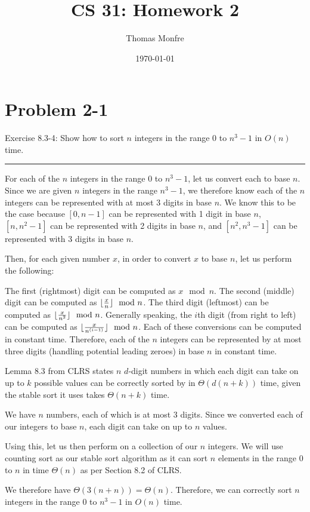 \documentclass[11pt]{article}
\title{CS 31: Homework 2}
\author{Thomas Monfre}
\date{\today}
\def\separateline{\medskip\hrule\medskip}
\DeclarePairedDelimiter\floor{\lfloor}{\rfloor}
\begin{document}
\maketitle

\section{Problem 2-1}
Exercise 8.3-4: Show how to sort $n$ integers in the range 0 to $n^3 - 1$ in $O(n)$ time.
\separateline

For each of the $n$ integers in the range 0 to $n^3 - 1$, let us convert each to base $n$. Since we are given $n$ integers in the range $n^3 - 1$, we therefore know each of the $n$ integers can be represented with at most 3 digits in base $n$. We know this to be the case because $[0, n-1]$ can be represented with 1 digit in base $n$, $[n, n^2 - 1]$ can be represented with 2 digits in base $n$, and $[n^2, n^3 - 1]$ can be represented with 3 digits in base $n$.

Then, for each given number $x$, in order to convert $x$ to base $n$, let us perform the following:

The first (rightmost) digit can be computed as $x \mod n$. The second (middle) digit can be computed as $\floor{\frac{x}{n}} \mod n$. The third digit (leftmost) can be computed as $\floor{\frac{x}{n^2}} \mod n$. Generally speaking, the $i$th digit (from right to left) can be computed as $\floor{\frac{x}{n^{(i - 1)}}} \mod n$. Each of these conversions can be computed in constant time. Therefore, each of the $n$ integers can be represented by at most three digits (handling potential leading zeroes) in base $n$ in constant time.

Lemma 8.3 from CLRS states $n$ $d$-digit numbers in which each digit can take on up to $k$ possible values can be correctly sorted by  in $\Theta(d(n + k))$ time, given the stable sort it uses takes $\Theta(n + k)$ time.

We have $n$ numbers, each of which is at most 3 digits. Since we converted each of our integers to base $n$, each digit can take on up to $n$ values.

Using this, let us then perform  on a collection of our $n$ integers. We will use counting sort as our stable sort algorithm as it can sort $n$ elements in the range 0 to $n$ in time $\Theta(n)$ as per Section 8.2 of CLRS.

We therefore have $\Theta(3(n + n)) = \Theta(n)$. Therefore, we can correctly sort $n$ integers in the range 0 to $n^3 - 1$ in $O(n)$ time.
\end{document}

